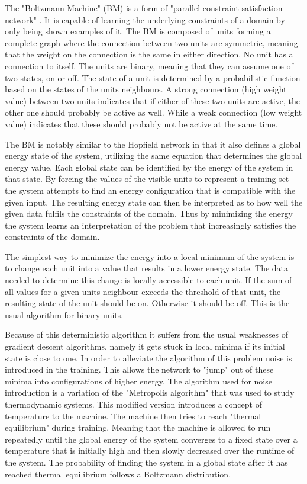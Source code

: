 \documentclass[12pt, a4paper]{article}
\begin{document}
The "Boltzmann Machine" (BM) is a form of "parallel constraint satisfaction network" \cite{ackley1985learning}. It is capable of learning the underlying constraints of a domain by only being shown examples of it. The BM is composed of units forming a complete graph where the connection between two units are symmetric, meaning that the weight on the connection is the same in either direction. No unit has a connection to itself. The units are binary, meaning that they can assume one of two states, on or off. The state of a unit is determined by a probabilistic function based on the states of the units neighbours. A strong connection (high weight value) between two units indicates that if either of these two units are active, the other one should probably be active as well. While a weak connection (low weight value) indicates that these should probably not be active at the same time.

The BM is notably similar to the Hopfield network in that it also defines a global energy state of the system, utilizing the same equation that determines the global energy value. Each global state can be identified by the energy of the system in that state. By forcing the values of the visible units to represent a training set the system attempts to find an energy configuration that is compatible with the given input. The resulting energy state can then be interpreted as to how well the given data fulfils the constraints of the domain. Thus by minimizing the energy the system learns an interpretation of the problem that increasingly satisfies the constraints of the domain.

The simplest way to minimize the energy into a local minimum of the system is to change each unit into a value that results in a lower energy state. The data needed to determine this change is locally accessible to each unit. If the sum of all values for a given units neighbour exceeds the threshold of that unit, the resulting state of the unit should be on. Otherwise it should be off. This is the usual algorithm for binary units.

Because of this deterministic algorithm it suffers from the usual weaknesses of gradient descent algorithms, namely it gets stuck in local minima if its initial state is close to one. In order to alleviate the algorithm of this problem noise is introduced in the training. This allows the network to "jump" out of these minima into configurations of higher energy. The algorithm used for noise introduction is a variation of the "Metropolis algorithm" \cite{metropolis1953equation} that was used to study thermodynamic systems. This modified version introduces a concept of temperature to the machine. The machine then tries to reach "thermal equilibrium" during training. Meaning that the machine is allowed to run repeatedly until the global energy of the system converges to a fixed state over a temperature that is initially high and then slowly decreased over the runtime of the system. The probability of finding the system in a global state after it has reached thermal equilibrium follows a Boltzmann distribution.
\end{document}
